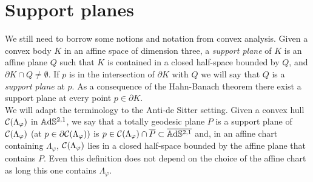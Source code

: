 

\section{Support planes}\label{sectionplanes}
We still need to borrow some notions and notation from convex analysis. Given a convex body $K$ in an affine space of dimension three, a \textit{support plane} of $K$ is an affine plane $Q$ such that $K$ is contained in a closed half-space bounded by $Q$, and $\partial K\cap Q\neq\emptyset.$ If $p$ is in the intersection of $\partial K$ with $Q$ we will say that $Q$ is a \textit{support plane} at $p$. As a consequence of the Hahn-Banach theorem there exist a support plane at every point $p\in\partial K.$ \\
We will adapt the terminology to the Anti-de Sitter setting. Given a convex hull $\mathcal{C}(\Lambda_\varphi)$ in $\mathbb{A}\mathrm{d}\mathbb{S}^{2,1}$, we say that a totally geodesic plane $P$ is a support plane of $\mathcal{C}(\Lambda_\varphi)$ (at $p\in\partial\mathcal{C}(\Lambda_\varphi))$ is $p\in\mathcal{C}(\Lambda_\varphi)\cap \overline{P}\subset\overline{\mathbb{A}\mathrm{d}\mathbb{S}^{2,1}}$ and, in an affine chart containing $\Lambda_\varphi$, $\mathcal{C}(\Lambda_\varphi)$ lies in a closed half-space bounded by the affine plane that contains $P$. Even this definition does not depend on the choice of the affine chart as long this one contains $\Lambda_\varphi$.\\ 

